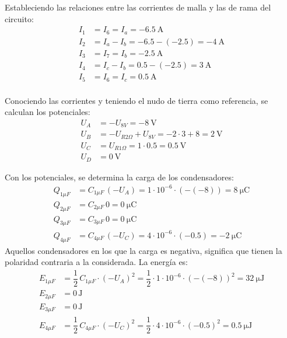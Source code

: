 Estableciendo las relaciones entre las corrientes de malla y las de
rama del circuito:
\begin{align*}
  I_1&=I_6=I_a=\qty{-6.5}{\ampere}\\
  I_2&=I_a-I_b=-6.5-(-2.5)=\qty{-4}{\ampere}\\
  I_3&=I_7=I_b=\qty{-2.5}{\ampere}\\
  I_4&=I_c-I_b=0.5-(-2.5)=\qty{3}{\ampere}\\
  I_5&=I_6=I_c=\qty{0.5}{\ampere}\\
\end{align*}

Conociendo las corrientes y teniendo el nudo de tierra como
referencia, se calculan los potenciales:
\begin{align*}
  U_A&=-U_{8V}=\qty{-8}{\volt}\\
  U_B&=-U_{R2\Omega}+U_{8V}=-2\cdot 3+8=\qty{2}{\volt}\\
  U_C&=U_{R1\Omega}=1\cdot 0.5=\qty{0.5}{\volt}\\
  U_D&=\qty{0}{\volt}
\end{align*}

Con los potenciales, se determina la carga de los condensadores:
\begin{align*}
  Q_{1\mu F}&=C_{1\mu F}\, (-U_{A}) = 1\cdot 10^{-6}\cdot (-(-8))=\qty{8}{\micro\coulomb}\\
  Q_{2\mu F}&=C_{2\mu F}\, 0 = \qty{0}{\micro\coulomb}\\
  Q_{3\mu F}&=C_{3\mu F}\, 0 = \qty{0}{\micro\coulomb}\\
  Q_{4\mu F}&=C_{4\mu F}\, (-U_C) = 4\cdot 10^{-6}\cdot (-0.5)=\qty{-2}{\micro\coulomb}
\end{align*}
Aquellos condensadores en los que la carga es negativa, significa que
tienen la polaridad contraria a la considerada. La energía es:
\begin{align*}
  E_{1\mu F}&=\dfrac{1}{2}\,C_{1\mu F}\cdot (-U_{A})^2 = \dfrac{1}{2}\cdot 1\cdot 10^{-6}\cdot (-(-8))^2=\qty{32}{\micro\joule}\\
  E_{2\mu F}&=0\,\text{J}\\
  E_{3\mu F}&=0\,\text{J}\\
  E_{4\mu F}&=\dfrac{1}{2}\,C_{4\mu F}\cdot (-U_{C})^2 = \dfrac{1}{2}\cdot 4\cdot 10^{-6}\cdot (-0.5)^2=\qty{0.5}{\micro\joule}
\end{align*}

